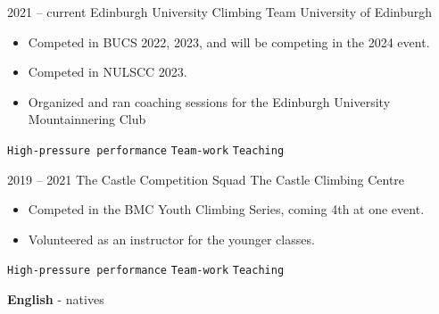 \documentclass[9pt]{developercv} %
\begin{document}
\vspace{-10 pt}
\begin{entrylist}
	\entry
        {2021 -- current}
		{Edinburgh University Climbing Team}
		{University of Edinburgh}
		{\vspace{-10pt}
        \begin{itemize}[noitemsep,topsep=0pt,parsep=0pt,partopsep=0pt, leftmargin=-1pt]
            \item Competed in BUCS 2022, 2023, and will be competing in the 2024 event. 
            \item Competed in NULSCC 2023. 
            \item Organized and ran coaching sessions for the Edinburgh University Mountainnering Club
        \end{itemize} 
        \texttt{High-pressure performance} \slashsep \texttt{Team-work} \slashsep \texttt{Teaching}}
	\entry
		{2019 -- 2021}
		{The Castle Competition Squad}
		{The Castle Climbing Centre}
		{\vspace{-10pt}
        \begin{itemize}[noitemsep,topsep=0pt,parsep=0pt,partopsep=0pt, leftmargin=-1pt]
            \item Competed in the BMC Youth Climbing Series, coming 4th at one event.
            \item Volunteered as an instructor for the younger classes. 
        \end{itemize} 
        \texttt{High-pressure performance} \slashsep \texttt{Team-work} \slashsep \texttt{Teaching}}
\end{entrylist}

\vspace{-10 pt}
    \vspace{-6pt}
    
    \hspace{26mm} \textbf{English} - natives

\end{document}
